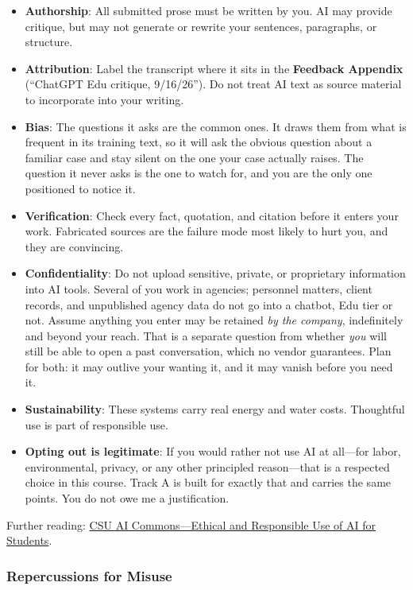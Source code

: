 \documentclass[11pt]{article}     %
\begin{document}
\begin{itemize}
    \item \textbf{Authorship}: All submitted prose must be written by you. AI may provide critique, but may not generate or rewrite your sentences, paragraphs, or structure.
    \item \textbf{Attribution}: Label the transcript where it sits in the \textbf{Feedback Appendix} (``ChatGPT Edu critique, 9/16/26''). Do not treat AI text as source material to incorporate into your writing.
    \item \textbf{Bias}: The questions it asks are the common ones. It draws them from what is frequent in its training text, so it will ask the obvious question about a familiar case and stay silent on the one your case actually raises. The question it never asks is the one to watch for, and you are the only one positioned to notice it.
    \item \textbf{Verification}: Check every fact, quotation, and citation before it enters your work. Fabricated sources are the failure mode most likely to hurt you, and they are convincing.
    \item \textbf{Confidentiality}: Do not upload sensitive, private, or proprietary information into AI tools. Several of you work in agencies; personnel matters, client records, and unpublished agency data do not go into a chatbot, Edu tier or not. Assume anything you enter may be retained \emph{by the company}, indefinitely and beyond your reach. That is a separate question from whether \emph{you} will still be able to open a past conversation, which no vendor guarantees. Plan for both: it may outlive your wanting it, and it may vanish before you need it.
    \item \textbf{Sustainability}: These systems carry real energy and water costs. Thoughtful use is part of responsible use.
    \item \textbf{Opting out is legitimate}: If you would rather not use AI at all---for labor, environmental, privacy, or any other principled reason---that is a respected choice in this course. Track A is built for exactly that and carries the same points. You do not owe me a justification.
\end{itemize}

\noindent Further reading: \href{https://genai.calstate.edu/communities/students/ethical-and-responsible-use-ai}{CSU AI Commons---Ethical and Responsible Use of AI for Students}.

\subsubsection*{Repercussions for Misuse}
\end{document}

